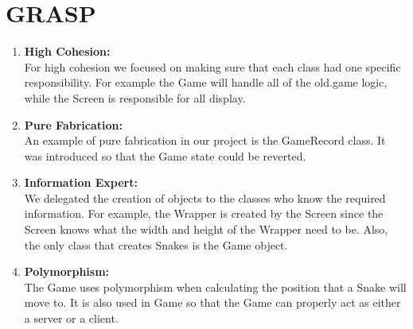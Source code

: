 \documentclass[titlepage]{article}
\begin{document}
	\section{GRASP}
		\begin{enumerate}
			\item \textbf{High Cohesion:}\\
			For high cohesion we focused on making sure that each class had one specific responsibility. For example the Game will handle all of the old.game logic, while the Screen is responsible for all display.
			\item \textbf{Pure Fabrication:}\\
			An example of pure fabrication in our project is the GameRecord class. It was introduced so that the Game state could be reverted.
			\item \textbf{Information Expert:}\\
			We delegated the creation of objects to the classes who know the required information. For example, the Wrapper is created by the Screen since the Screen knows what the width and height of the Wrapper need to be. Also, the only class that creates Snakes is the Game object.
			\item \textbf{Polymorphism:}\\
			The Game uses polymorphism when calculating the position that a Snake will move to. It is also used in Game so that the Game can properly act as either a server or a client.
		\end{enumerate}
	
\end{document}
